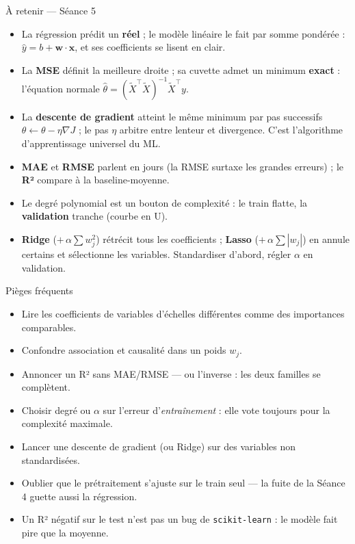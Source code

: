 \documentclass[aspectratio=169,11pt]{beamer}
\begin{document}
\begin{frame}{À retenir — Séance 5}
\begin{ucadret}[L'essentiel]
\begin{itemize}\small
  \item La régression prédit un \textbf{réel} ; le modèle linéaire le fait par somme pondérée : $\hat y = b + \mathbf{w}\cdot\mathbf{x}$, et ses coefficients se lisent en clair.
  \item La \textbf{MSE} définit la meilleure droite ; sa cuvette admet un minimum \textbf{exact} : l'équation normale $\hat\theta = (\tilde X^{\top}\tilde X)^{-1}\tilde X^{\top}y$.
  \item La \textbf{descente de gradient} atteint le même minimum par pas successifs $\theta \leftarrow \theta - \eta\nabla J$ ; le pas $\eta$ arbitre entre lenteur et divergence. C'est l'algorithme d'apprentissage universel du ML.
  \item \textbf{MAE} et \textbf{RMSE} parlent en jours (la RMSE surtaxe les grandes erreurs) ; le \textbf{R²} compare à la baseline-moyenne.
  \item Le degré polynomial est un bouton de complexité : le train flatte, la \textbf{validation} tranche (courbe en U).
  \item \textbf{Ridge} ($+\,\alpha\sum w_j^2$) rétrécit tous les coefficients ; \textbf{Lasso} ($+\,\alpha\sum|w_j|$) en annule certains et sélectionne les variables. Standardiser d'abord, régler $\alpha$ en validation.
\end{itemize}
\end{ucadret}
\end{frame}

\begin{frame}{Pièges fréquents}
\begin{itemize}\small
  \item Lire les coefficients de variables d'échelles différentes comme des importances comparables.
  \item Confondre association et causalité dans un poids $w_j$.
  \item Annoncer un R² sans MAE/RMSE — ou l'inverse : les deux familles se complètent.
  \item Choisir degré ou $\alpha$ sur l'erreur d'\emph{entraînement} : elle vote toujours pour la complexité maximale.
  \item Lancer une descente de gradient (ou Ridge) sur des variables non standardisées.
  \item Oublier que le prétraitement s'ajuste sur le train seul — la fuite de la Séance 4 guette aussi la régression.
  \item Un R² négatif sur le test n'est pas un bug de \texttt{scikit-learn} : le modèle fait pire que la moyenne.
\end{itemize}
\end{frame}
\end{document}
